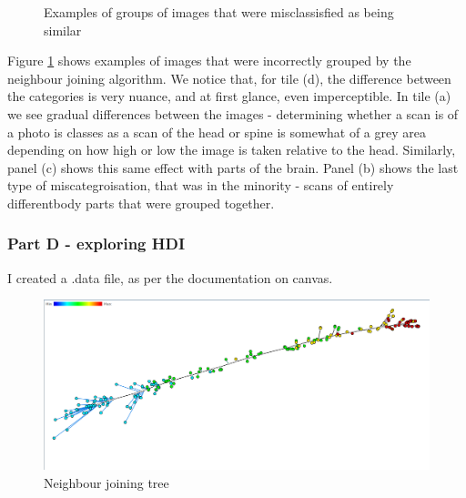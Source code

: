 \documentclass[ 10pt ]{fphw}
\begin{document}
\begin{figure}[H]
\begin{minipage}[b][\ht\measurebox][s]{.45\textwidth}
\vfill
{}
\end{minipage}
\caption{Examples of groups of images that were misclassisfied as being similar}
\label{fig:medmisclass}
\end{figure}

Figure \ref{fig:medmisclass} shows examples of images that were incorrectly grouped by the neighbour joining algorithm. We notice that, for tile (d), the difference between the categories is very nuance, and at first glance, even imperceptible. In tile (a) we see gradual differences between the images - determining whether a scan is of a photo is classes as a scan of the head or spine is somewhat of a grey area depending on how high or low the image is taken relative to the head. Similarly, panel (c) shows this same effect with parts of the brain. Panel (b) shows the last type of miscategroisation, that was in the minority - scans of entirely differentbody parts that were grouped together.


\subsubsection*{Part D - exploring HDI}

I created a .data file, as per the documentation on canvas.  

\begin{center}
\begin{figure}[H]
    \centering
	\includegraphics[width=0.65\columnwidth]{hdiProj/hdiNJ.PNG}
	\caption{Neighbour joining tree}
	\label{fig:hdiNJ}
	\end{figure}
\end{center}
\end{document}
